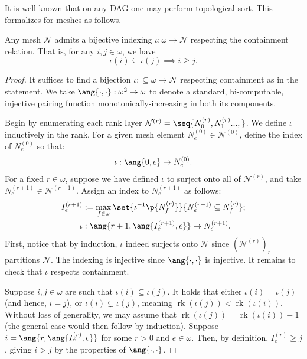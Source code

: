 It is well-known that on any DAG one may perform topological sort. This formalizes for meshes as follows.
\begin{proposition}
    \label{proposition:indexing_for_meshes}
    Any mesh $\mathcal{N}$ admits a bijective indexing $\iota: \omega \to \mathcal{N}$ respecting the containment relation. That is, for any $i, j \in \omega$, we have 
    \[\iota(i) \subseteq \iota(j) \implies i \geq j.\]
\end{proposition}
\begin{proof}
    It suffices to find a bijection $\iota : \subseteq \omega \to \mathcal{N}$ respecting containment as in the statement. We take $\ang{\cdot, \cdot} : \omega^2 \to \omega$ to denote a standard, bi-computable, injective pairing function monotonically-increasing in both its components. 

    Begin by enumerating each rank layer $\mathcal{N}^{(r)} = \seq{N^{(r)}_0, N^{(r)}_1 ..., }$. We define $\iota$ inductively in the rank. For a given mesh element $N^{(0)}_e \in \mathcal{N}^{(0)}$, define the index of $N^{(0)}_e$ so that:
     \begin{align*}
         \iota : \ang{0, e} \mapsto N^{(0)}_e.
     \end{align*}
     For a fixed $r \in \omega$, suppose we have defined $\iota$ to surject onto all of $\mathcal{N}^{(r)}$, and take $N^{(r + 1)}_e \in \mathcal{N}^{(r + 1)}$. Assign an index to $N^{(r + 1)}_e$ as follows:
     \begin{align*}
         I^{(r + 1)}_e &:= \max_{f \in \omega} \set{\iota^{-1}\p{N^{(r)}_f}}{N^{(r + 1)}_e \subseteq N^{(r)}_f};\\
         \iota &: \ang{r + 1, \ang{I^{(r + 1)}_e, e}} \mapsto N^{(r + 1)}_e.
     \end{align*}
     First, notice that by induction, $\iota$ indeed surjects onto $\mathcal{N}$ since $(\mathcal{N}^{(r)})_r$ partitions $\mathcal{N}$. The indexing is injective since $\ang{\cdot, \cdot}$ is injective. It remains to check that $\iota$ respects containment. 
     
     Suppose $i, j \in \omega$ are such that $\iota(i) \subseteq \iota(j)$. It holds that either $\iota(i) = \iota(j)$ (and hence, $i = j$), or $\iota(i) \subsetneq \iota(j)$, meaning $\operatorname{rk}(\iota(j)) < \operatorname{rk}(\iota(i))$. Without loss of generality, we may assume that $\operatorname{rk}(\iota(j)) = \operatorname{rk}(\iota(i)) - 1$ (the general case would then follow by induction). Suppose $i = \ang{r, \ang{I^{(r)}_e, e}}$ for some $r > 0$ and $e \in \omega$. Then, by definition, $I^{(r)}_e \geq j$, giving $i > j$ by the properties of $\ang{\cdot, \cdot}$. 
\end{proof}

